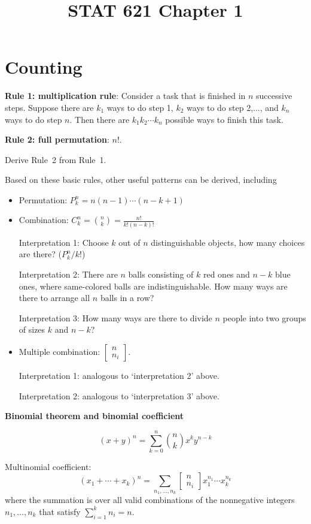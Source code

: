 \documentclass[12pt]{article}
\begin{document}
\title{STAT 621 Chapter 1}
\maketitle

\section{Counting}

\textbf{Rule 1: multiplication rule}:
Consider a task that is finished in $n$ successive steps.
Suppose there are $k_1$ ways to do step 1,
$k_2$ ways to do step 2,...,
and
$k_n$ ways to do step $n$.
Then there are
$k_1 k_2\cdots k_n$ possible ways to finish this task.

\textbf{Rule 2: full permutation}:
$n!$.

\example Derive Rule~2 from Rule~1.

Based on these basic rules, other useful patterns can be derived, including
\begin{itemize}
\item Permutation: $P_k^n = n(n-1)\cdots (n-k+1)$
\item Combination: $C_k^n = {n \choose k} = \frac{n!}{k!(n-k)!}$

Interpretation 1: Choose $k$ out of $n$ distinguishable objects,
how many choices are there?
($P_k^n / k!$)

Interpretation 2: There are $n$ balls consisting of $k$ red ones
and $n-k$ blue ones, where same-colored balls are indistinguishable.
How many ways are there to arrange all $n$ balls in a row?

Interpretation 3: How many ways are there to divide $n$ people into two
groups of sizes $k$ and $n-k$?
\item Multiple combination: $\begin{bmatrix}n\\ n_i\end{bmatrix}$.

Interpretation 1: analogous to `interpretation 2' above.

Interpretation 2: analogous to `interpretation 3' above.
\end{itemize}

\textbf{Binomial theorem and binomial coefficient}

\[
(x + y)^n = \sum_{k=0}^n {n\choose k} x^k y^{n-k}
\]

Multinomial coefficient:
\[
(x_1 + \dotsb + x_k)^n = \sum_{n_1,\dotsc,n_k}
    \begin{bmatrix}n\\ n_i\end{bmatrix} x_1^{n_1}\dotsb x_k^{n_k}
\]
where the summation is over all valid combinations of the nonnegative
integers $n_1,\dotsc,n_k$ that satisfy $\sum_{i=1}^k n_i = n$.
\end{document}
